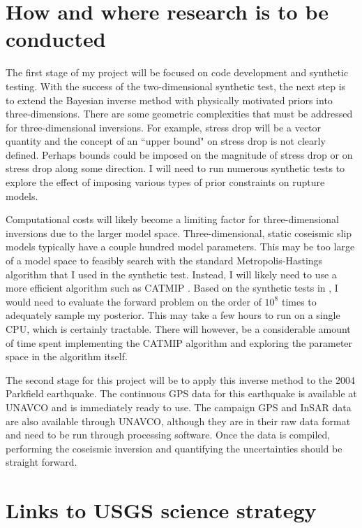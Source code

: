 \documentclass[12pt]{article}
\begin{document}
\section*{How and where research is to be conducted}
The first stage of my project will be focused on code development and synthetic testing.  With the success of the two-dimensional synthetic test, the next step is to extend the Bayesian inverse method with physically motivated priors into three-dimensions.  There are some geometric complexities that must be addressed for three-dimensional inversions.  For example, stress drop will be a vector quantity and the concept of an ``upper bound" on stress drop is not clearly defined.  Perhaps bounds could be imposed on the magnitude of stress drop or on stress drop along some direction.  I will need to run numerous synthetic tests to explore the effect of imposing various types of prior constraints on rupture models.  

Computational costs will likely become a limiting factor for three-dimensional inversions due to the larger model space.  Three-dimensional, static coseismic slip models typically have a couple hundred model parameters.  This may be too large of a model space to feasibly search with the standard Metropolis-Hastings algorithm that I used in the synthetic test.  Instead, I will likely need to use a more efficient algorithm such as CATMIP \citep{Minson2013}.  Based on the synthetic tests in \citep{Minson2013}, I would need to evaluate the forward problem on the order of $10^{8}$ times to adequately sample my posterior.  This may take a few hours to run on a single CPU, which is certainly tractable.  There will however, be a considerable amount of time spent implementing the CATMIP algorithm and exploring the parameter space in the algorithm itself.  

The second stage for this project will be to apply this inverse method to the 2004 Parkfield earthquake.  The continuous GPS data for this earthquake is available at UNAVCO and is immediately ready to use.  The campaign GPS and InSAR data are also available through UNAVCO, although they are in their raw data format and need to be run through processing software. Once the data is compiled, performing the coseismic inversion and quantifying the uncertainties should be straight forward.        


\section*{Links to USGS science strategy}
\end{document}
